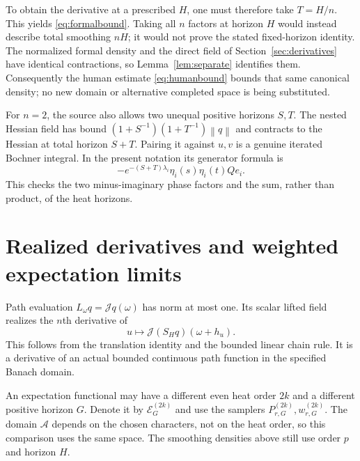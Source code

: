 \documentclass[11pt]{article}
\theoremstyle{remark}\newtheorem{remark}[theorem]{Remark}
\newcommand{\A}{\mathcal A}\newcommand{\X}{\mathcal X}
\newcommand{\E}{\mathcal E}\newcommand{\norm}[1]{\left\lVert#1\right\rVert}
\begin{document}
To obtain the derivative at a prescribed $H$, one must therefore take $T=H/n$. This yields \eqref{eq:formalbound}. Taking all $n$ factors at horizon $H$ would instead describe total smoothing $nH$; it would not prove the stated fixed-horizon identity. The normalized formal density and the direct field of Section~\ref{sec:derivatives} have identical contractions, so Lemma~\ref{lem:separate} identifies them. Consequently the human estimate \eqref{eq:humanbound} bounds that same canonical density; no new domain or alternative completed space is being substituted.

For $n=2$, the source also allows two unequal positive horizons $S,T$. The nested Hessian field has bound $(1+S^{-1})(1+T^{-1})\norm q$ and contracts to the Hessian at total horizon $S+T$. Pairing it against $u,v$ is a genuine iterated Bochner integral. In the present notation its generator formula is
\[
 -e^{-(S+T)\lambda_i}\eta_i(s)\eta_i(t)Qe_i.
\]
This checks the two minus-imaginary phase factors and the sum, rather than product, of the heat horizons.

\section{Realized derivatives and weighted expectation limits}\label{sec:weighted}
Path evaluation $L_\omega q=\mathcal Jq(\omega)$ has norm at most one. Its scalar lifted field realizes the $n$th derivative of
\[
 u\longmapsto\mathcal J(S_Hq)(\omega+h_u).
\]
This follows from the translation identity and the bounded linear chain rule. It is a derivative of an actual bounded continuous path function in the specified Banach domain.

An expectation functional may have a different even heat order $2k$ and a different positive horizon $G$. Denote it by $\E^{(2k)}_G$ and use the samplers $P^{(2k)}_{r,G},w^{(2k)}_{r,G}$. The domain $\A$ depends on the chosen characters, not on the heat order, so this comparison uses the same space. The smoothing densities above still use order $p$ and horizon $H$.
\end{document}
